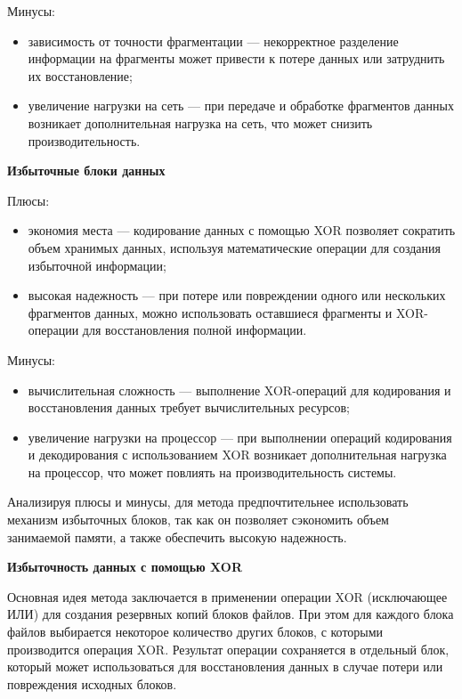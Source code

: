 \begin{flushleft}
Минусы:
\end{flushleft}

\begin{itemize}
\item зависимость от точности фрагментации --- некорректное разделение информации на фрагменты может привести к потере данных или затруднить их восстановление;
\item увеличение нагрузки на сеть --- при передаче и обработке фрагментов данных возникает дополнительная нагрузка на сеть, что может снизить производительность.
\end{itemize}

\begin{flushleft}
\textbf{Избыточные блоки данных}

Плюсы:
\end{flushleft}
\begin{itemize}
\item экономия места --- кодирование данных с помощью XOR позволяет сократить объем хранимых данных, используя математические операции для создания избыточной информации;
\item высокая надежность --- при потере или повреждении одного или нескольких фрагментов данных, можно использовать оставшиеся фрагменты и XOR-операции для восстановления полной информации.
\end{itemize}

\begin{flushleft}
Минусы:
\end{flushleft}

\begin{itemize}
\item вычислительная сложность --- выполнение XOR-операций для кодирования и восстановления данных требует вычислительных ресурсов;
\item увеличение нагрузки на процессор --- при выполнении операций кодирования и декодирования с использованием XOR возникает дополнительная нагрузка на процессор, что может повлиять на производительность системы.
\end{itemize}

Анализируя плюсы и минусы, для метода предпочтительнее использовать механизм избыточных блоков, так как он позволяет сэкономить объем занимаемой памяти, а также обеспечить высокую надежность.  

\textbf{Избыточность данных с помощью XOR}

Основная идея метода заключается в применении операции XOR (исключающее ИЛИ) для создания резервных копий блоков файлов. При этом для каждого блока файлов выбирается некоторое количество других блоков, с которыми производится операция XOR. Результат операции сохраняется в отдельный блок, который может использоваться для восстановления данных в случае потери или повреждения исходных блоков.

